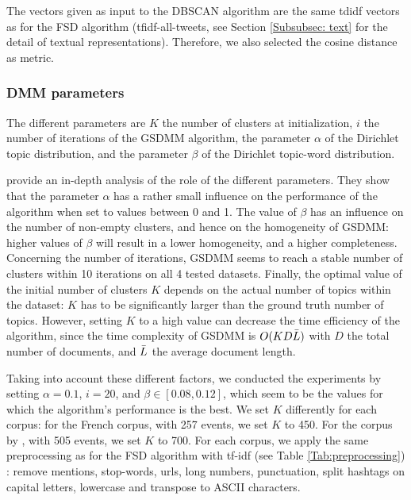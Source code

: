 The vectors given as input to the DBSCAN algorithm are the same tdidf vectors as for the FSD algorithm (tfidf-all-tweets, see Section \ref{Subsubsec: text} for the detail of textual representations). Therefore, we also selected the cosine distance as metric.

\subsubsection{DMM parameters}
 The different parameters are $K$ the number of clusters at initialization, $i$ the number of iterations of the GSDMM algorithm, the parameter $\alpha$ of the Dirichlet topic distribution, and the parameter $\beta$ of the Dirichlet topic-word distribution.

\citet{yin_dirichlet_2014} provide an in-depth analysis of the role of the different parameters. They show that the parameter $\alpha$ has a rather small influence on the performance of the algorithm when set to values between 0 and 1. The value of $\beta$ has an influence on the number of non-empty clusters, and hence on the homogeneity of GSDMM: higher values of $\beta$ will result in a lower homogeneity, and a higher completeness. Concerning the number of iterations, GSDMM seems to reach a stable number of clusters within 10 iterations on all 4 tested datasets. Finally, the optimal value of the initial number of clusters $K$ depends on the actual number of topics within the dataset: $K$ has to be significantly larger than the ground truth number of topics. However, setting $K$ to a high value can decrease the time efficiency of the algorithm, since the time complexity of GSDMM is $O(KD\Bar{L})$ with $D$ the total number of documents, and $\Bar{L}$ the average document length.

Taking into account these different factors, we conducted the experiments by setting $\alpha=0.1$, $i=20$, and $\beta \in [0.08, 0.12]$, which seem to be the values for which the algorithm's performance is the best. We set $K$ differently for each corpus: for the French corpus, with 257 events, we set $K$ to 450. For the corpus by \citet{mcminn_building_2013}, with 505 events, we set $K$ to 700. For each corpus, we apply the same preprocessing as for the FSD algorithm with tf-idf (see Table \ref{Tab:preprocessing}) : remove mentions, stop-words, urls, long numbers, punctuation, split hashtags on capital letters, lowercase and transpose to ASCII characters.

